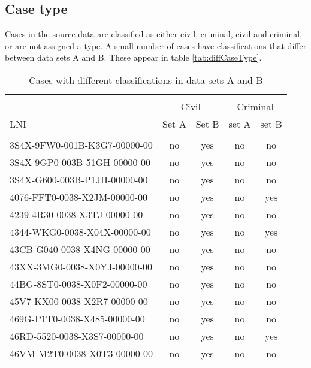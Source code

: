 \documentclass[10pt, letterpaper]{article}
\begin{document}
\begin{spacing}{1.0}

\clearpage

\section{Case type}

Cases in the source data are classified as either civil, criminal, civil and criminal, or are not assigned a type.  A small number of cases have classifications that differ between data sets A and B.  These appear in table \ref{tab:diffCaseType}.

\vspace{0.5in}

\begin{table}[H]
    \centering
    \caption{Cases with different classifications in data sets A and B}
    \begin{tabular}{lcccc}
        \hline\\[-6pt]
        & \multicolumn{2}{c}{Civil} & \multicolumn{2}{c}{Criminal}\\
        LNI & Set A & Set B & set A & set B\\[4pt]
        \hline\\
        3S4X-9FW0-001B-K3G7-00000-00 & no & yes & no & no\\
        3S4X-9GP0-003B-51GH-00000-00 & no & yes & no & no\\
        3S4X-G600-003B-P1JH-00000-00 & no & yes & no & no\\
        4076-FFT0-0038-X2JM-00000-00 & no & yes & no & yes\\
        4239-4R30-0038-X3TJ-00000-00 & no & yes & no & no\\
        4344-WKG0-0038-X04X-00000-00 & no & yes & no & yes\\
        43CB-G040-0038-X4NG-00000-00 & no & yes & no & no\\
        43XX-3MG0-0038-X0YJ-00000-00 & no & yes & no & no\\
        44BG-8ST0-0038-X0F2-00000-00 & no & yes & no & no\\
        45V7-KX00-0038-X2R7-00000-00 & no & yes & no & no\\
        469G-P1T0-0038-X485-00000-00 & no & yes & no & no\\
        46RD-5520-0038-X3S7-00000-00 & no & yes & no & yes\\
        46VM-M2T0-0038-X0T3-00000-00 & no & yes & no & no\\

\end{tabular}
\end{table}
\end{spacing}
\end{document}
